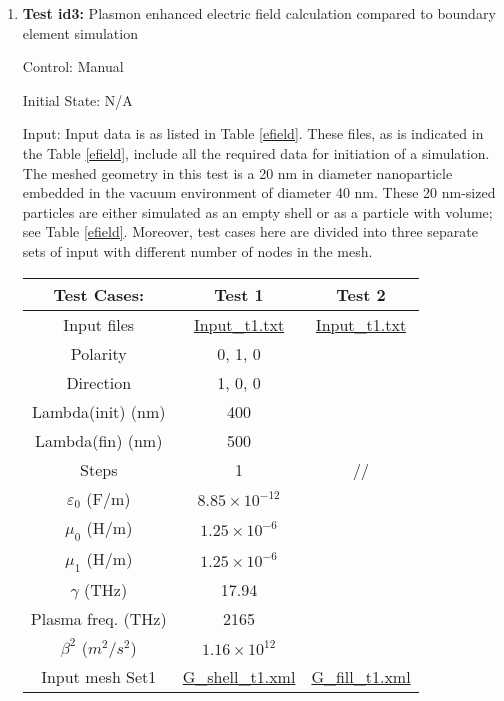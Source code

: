 \documentclass[12pt, titlepage]{article}
\begin{document}
\begin{enumerate}
	
	\item{\textbf{Test id3:} Plasmon enhanced electric field calculation compared to boundary element simulation\\}
	
	Control: Manual
	
	Initial State: N/A 
	
	Input: Input data is as listed in Table \ref{efield}. These files, as is indicated in the Table \ref{efield}, include all the required data for initiation of a \progname{} simulation. The meshed geometry in this test is a 20 nm in diameter nanoparticle embedded in the vacuum environment of diameter 40 nm. These 20 nm-sized particles are either simulated as an empty shell or as a particle with volume; see Table \ref{efield}. Moreover, test cases here are divided into three separate sets of input with different number of nodes in the mesh.  
	
	\begin{table}
		\centering
		\begin{tabular}{|c|c|c|}
			\hline
			Test Cases: & Test 1 & Test 2  \\
			\hline 
			Input files & \href{https://github.com/shmouses/SPDFM/tree/master/src/Input/Input_t1.txt}{Input\_t1.txt} & \href{https://github.com/shmouses/SPDFM/tree/master/src/Input/Input_t1.txt}{Input\_t1.txt} \\
			Polarity & 0, 1, 0  &   \\
			Direction & 1, 0, 0 &  \\
			Lambda(init) (nm) &400 &  \\
			Lambda(fin) (nm) &500 &  \\
			Steps & 1 & // \\
			$\varepsilon_0$ (F/m) & $8.85 \times 10^{-12}$  &  \\
			$\mu_0$ (H/m) & $ 1.25 \times 10^{-6}$ &  \\
			$\mu_1$ (H/m) & $ 1.25 \times 10^{-6}$ &  \\
			$\gamma$ (THz)& 17.94 &  \\
			Plasma freq. (THz)& 2165 &  \\
			$\beta^2$ ($m^2/s^2$) & $1.16 \times 10^{12}$ &  \\
			\hline 
			Input mesh Set1 & \href{https://github.com/shmouses/SPDFM/tree/master/src/Mesh}{G\_shell\_t1.xml} & \href{https://github.com/shmouses/SPDFM/tree/master/src/Mesh}{G\_fill\_t1.xml} \\
			

\end{tabular}
\end{table}
\end{enumerate}
\end{document}
